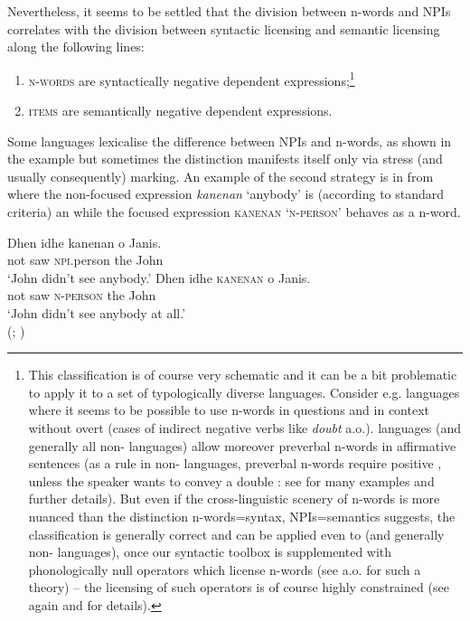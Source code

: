 \documentclass[output=paper, colorlinks, citecolor=brown, newtxmath]{langsci/langscibook}
\begin{document}
\noindent Nevertheless, it seems to be settled that the division between n-words and NPIs correlates with the division between syntactic licensing and semantic licensing along the following lines:%

\largerpage
\begin{enumerate}
\def\labelenumi{\arabic{enumi})}
\item
  \textsc{n-words} are syntactically negative dependent expressions;\footnote{This classification is of course very schematic and it can be a bit problematic to apply it to a set of typologically diverse languages. Consider e.g.  languages where it seems to be possible to use n-words in questions and in context without overt  (cases of indirect negative verbs like \textit{doubt} a.o.).  languages (and generally all non- languages) allow moreover preverbal n-words in affirmative sentences (as a rule in non- languages, preverbal n-words require positive , unless the speaker wants to convey a double : see \cite{laka1990negation} for many examples and further details). But even if the cross-linguistic scenery of n-words is more nuanced than the distinction n-words=syntax, NPIs=semantics suggests, the classification is generally correct and can be applied even to  (and generally non- languages), once our syntactic toolbox is supplemented with phonologically null operators which license n-words (see \citealt{zeijlstra2004sentential} a.o. for such a theory) -- the licensing of such operators is of course highly constrained (see again \citealt{zeijlstra2004sentential} and \citealt{zeijlstra2008negative} for details).}
\item \textsc{ items} are semantically negative dependent expressions.
\end{enumerate}

\noindent Some languages lexicalise the difference between NPIs and n-words, as   shown in the example  but sometimes the distinction manifests itself only via stress (and usually consequently)  marking. An example of the second strategy is in  from \cite{giannakidou2017landscape} where the non-focused expression \textit{kanenan} `anybody' is (according to standard criteria) an  while the focused expression \textsc{kanenan} `\textsc{n-person}' behaves as a n-word.\largerpage

\ea \label{ex-2}
\ea \gll Dhen idhe kanenan o Janis.\\
not saw \textsc{npi}.person the John\\
\glt `John didn't see anybody.'
\ex \gll Dhen idhe \textsc{kanenan} o Janis.\\
not saw \textsc{n-person} the John\\
\glt `John didn't see anybody at all.'\\\xspace\hfill (; \citealt[17]{giannakidou2017landscape})
\z
\z
\end{document}
